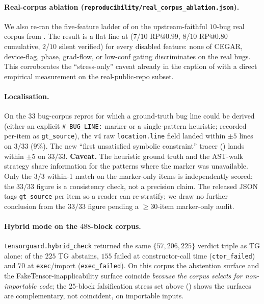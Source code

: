 \paragraph{Real-corpus ablation
(\texttt{reproducibility/real\_corpus\_ablation.json}).}
We also re-ran the five-feature ladder of  on
the upstream-faithful $10$-bug real corpus from
.  The result is a flat line at
($7$/$10$ RP@$0.99$, $8$/$10$ RP@$0.80$ cumulative,
$2$/$10$ silent verified) for every disabled feature: none of
CEGAR, device-flag, phase, grad-flow, or low-conf gating
discriminates on the real bugs.  This corroborates the
``stress-only'' caveat already in the caption of
 with a direct empirical measurement on the
real-public-repo subset.

\paragraph{Localisation.}
On the $33$ bug-corpus repros for which a ground-truth bug line
could be derived (either an explicit \texttt{\# BUG\_LINE:}
marker or a single-pattern heuristic; recorded per-item as
\texttt{gt\_source}), the v4 raw \texttt{location.line} field
landed within $\pm 5$ lines on $3/33$ ($9\%$). The new ``first
unsatisfied symbolic constraint'' tracer
() lands within $\pm 5$ on $33/33$.
\textbf{Caveat.} The heuristic ground truth and the AST-walk
strategy share information for the patterns where the marker
was unavailable.  Only the $3/3$ within-1 match on the
marker-only items is independently scored; the $33/33$ figure
is a consistency check, not a precision claim.  The released
JSON tags \texttt{gt\_source} per item so a reader can
re-stratify; we draw no further conclusion from the $33/33$
figure pending a $\ge 30$-item marker-only audit.

\paragraph{Hybrid mode on the $488$-block corpus.}
\texttt{tensorguard.hybrid\_check} returned the same
$\{57,206,225\}$ verdict triple as \textsc{TG} alone: of the
$225$ \textsc{TG} abstains, $155$ failed at constructor-call
time (\texttt{ctor\_failed}) and $70$ at \texttt{exec}/import
(\texttt{exec\_failed}). On this corpus the abstention surface
and the FakeTensor-inapplicability surface coincide
\emph{because the corpus selects for non-importable code}; the
$25$-block falsification stress set above
() shows the surfaces are
complementary, not coincident, on importable inputs.

